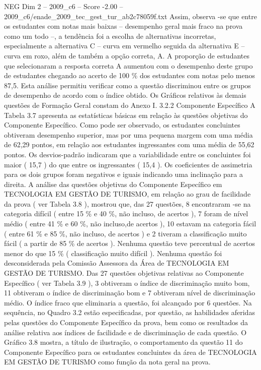 \begin{textsample}{NEG Dim 2 – 2009\_c6 – Score -2.00 – 2009\_c6/enade\_2009\_tec\_gest\_tur\_ab2c78059f.txt}
Assim, observa -se que entre os estudantes com notas mais baixas – desempenho geral mais fraco na prova como um todo –, a tendência foi a escolha de alternativas incorretas, especialmente a alternativa C – curva em vermelho seguida da alternativa E – curva em roxo, além de também a opção correta, A.
A proporção de estudantes que selecionaram a resposta correta A aumentou com o desempenho deste grupo de estudantes chegando ao acerto de 100 \% dos estudantes com notas pelo menos 87,5.
Esta análise permitiu verificar como a questão discriminou entre os grupos de desempenho de acordo com o índice obtido.
Os Gráficos relativos às demais questões de Formação Geral constam do Anexo I. 3.2.2 Componente Específico A Tabela 3.7 apresenta as estatísticas básicas em relação às questões objetivas do Componente Específico.
Como pode ser observado, os estudantes concluintes obtiveram desempenho superior, mas por uma pequena margem com uma média de 62,29 pontos, em relação aos estudantes ingressantes com uma média de 55,62 pontos.
Os desvios-padrão indicaram que a variabilidade entre os concluintes foi maior ( 15,7 ) do que entre os ingressantes ( 15,4 ).
Os coeficientes de assimetria para os dois grupos foram negativos e iguais indicando uma inclinação para a direita.
A análise das questões objetivas do Componente Específico em TECNOLOGIA EM GESTÃO DE TURISMO, em relação ao grau de facilidade da prova ( ver Tabela 3.8 ), mostrou que, das 27 questões, 8 encontraram -se na categoria difícil ( entre 15 \% e 40 \%, não incluso, de acertos ), 7 foram de nível médio ( entre 41 \% e 60 \%, não incluso,de acertos ), 10 estavam na categoria fácil ( entre 61 \% e 85 \%, não incluso, de acertos ) e 2 tiveram a classificação muito fácil ( a partir de 85 \% de acertos ).
Nenhuma questão teve percentual de acertos menor do que 15 \% ( classificação muito difícil ).
Nenhuma questão foi desconsiderada pela Comissão Assessora da Área de TECNOLOGIA EM GESTÃO DE TURISMO.
Das 27 questões objetivas relativas ao Componente Específico ( ver Tabela 3.9 ), 3 obtiveram o índice de discriminação muito bom, 11 obtiveram o índice de discriminação bom e 7 obtiveram nível de discriminação médio.
O índice fraco que eliminaria a questão, foi alcançado por 6 questões.
Na sequência, no Quadro 3.2 estão especificadas, por questão, as habilidades aferidas pelas questões do Componente Específico da prova, bem como os resultados da análise relativa aos índices de facilidade e de discriminação de cada questão.
O Gráfico 3.8 mostra, a título de ilustração, o comportamento da questão 11 do Componente Específico para os estudantes concluintes da área de TECNOLOGIA EM GESTÃO DE TURISMO como função da nota geral na prova.

\end{textsample}
